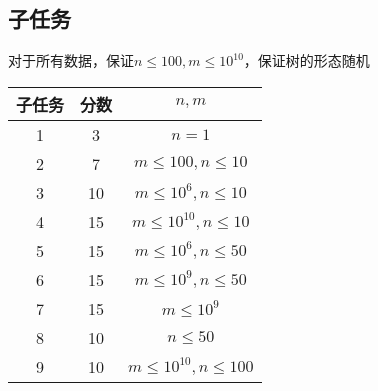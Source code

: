 \documentclass[12pt]{article}
\begin{document}
	\subsection{子任务}
	对于所有数据，保证$n\leq 100, m\leq 10^{10}$，保证树的形态随机\par
	\begin{table}[H]
		\centering
		\begin{tabular}{ccc}
			\toprule
			子任务 & 分数  & $n, m$ \\
			\midrule
			1 & 3 & $n = 1$ \\
			\midrule
			2 & 7 & $m\leq 100, n\leq 10$ \\
			\midrule
			3 & 10 & $m\leq 10^6, n\leq 10$ \\
			\midrule
			4 & 15 & $m\leq 10^{10}, n\leq 10$ \\
			\midrule
			5 & 15 & $m\leq 10^6, n\leq 50$ \\
			\midrule
			6 & 15 & $m\leq 10^9, n\leq 50$ \\
			\midrule
			7 & 15 & $m\leq 10^9$ \\
			\midrule
			8 & 10 & $n\leq 50$ \\
			\midrule
			9 & 10 & $m\leq 10^{10}, n\leq 100$ \\
			\bottomrule
		\end{tabular}
	\end{table}\par     
\end{document}
